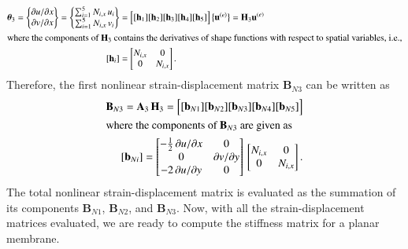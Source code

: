 \begin{subequations}
	\begin{align}
		\boldsymbol{\theta}_3 =  \begin{Bmatrix}
			\partial u / \partial x\\
			\partial v / \partial x
		\end{Bmatrix}
		= \begin{Bmatrix}
			\sum\nolimits_{i=1}^5 N_{i,x} \, u_i\\
			\sum\nolimits_{i=1}^5 N_{i,x} \, v_i
		\end{Bmatrix} 
		& = \begin{bmatrix}
			[\mathbf{h}_1] [\mathbf{h}_2] [\mathbf{h}_3] [\mathbf{h}_4] [\mathbf{h}_5] 
		\end{bmatrix} \bigl\{ \begin{matrix} \mathbf{u}^{(e)} \end{matrix} \bigr\} 
		= \mathbf{H}_3  \mathbf{u}^{(e)} \\
		\intertext{where the components of $\mathbf{H}_3$ contains the derivatives of shape functions with respect to spatial variables, i.e.,}
		[\mathbf{h}_i] & = \begin{bmatrix}
			N_{i,x} &  0  \\
			0 & N_{i,x}  \end{bmatrix} .
	\end{align}
\end{subequations}
Therefore, the first nonlinear strain-displacement matrix $\mathbf{B}_{N3}$ can be written as
\begin{subequations}
	\begin{align}
		\mathbf{B}_{N3} = \mathbf{A}_3 \, \mathbf{H}_3 = \begin{bmatrix}
			[\mathbf{b}_{N1}] [\mathbf{b}_{N2}] [\mathbf{b}_{N3}] [\mathbf{b}_{N4}] [\mathbf{b}_{N5}] 
		\end{bmatrix}  \\
		\intertext{where the components of $\mathbf{B}_{N3}$ are given as}
		[\mathbf{b}_{Ni}] = \begin{bmatrix}
			-\tfrac{1}{2} \, \partial u / \partial x &  0 \\
			0 &  \partial v / \partial y \\
			-2 \, \partial u / \partial y  & 0  \end{bmatrix}  \, \begin{bmatrix}
			N_{i,x} &  0  \\
			0 & N_{i,x}  \end{bmatrix}.
	\end{align}
\end{subequations}
The total nonlinear strain-displacement matrix is evaluated as the summation of its components $ \mathbf{B}_{N1}$, $\mathbf{B}_{N2}$, and $\mathbf{B}_{N3}$. Now, with all the strain-displacement matrices evaluated, we are ready to compute the stiffness matrix for a planar membrane.

